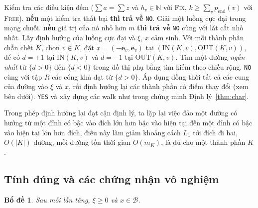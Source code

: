 \documentclass[pdflatex,sn-mathphys-num]{sn-jnl}
\theoremstyle{thmstyleone}
\newtheorem{lemma}[theorem]{Bổ đề}
\theoremstyle{thmstyletwo}
\theoremstyle{thmstylethree}
\newcommand{\N}{\mathbb{N}}
\newcommand{\cB}{\mathcal{B}}
\newcommand{\e}{\mathbf{e}}
\newcommand{\IN}{\mathrm{IN}}
\newcommand{\OUT}{\mathrm{OUT}}
\newcommand{\FIX}{\textup{\textsc{Fix}}}
\newcommand{\FREE}{\textup{\textsc{Free}}}
\newcommand{\YES}{\texttt{YES}}
\newcommand{\NO}{\texttt{NO}}
\begin{document}
\begin{algorithm}[t]
\caption{Thuật toán đường tăng cho \FIX{} và \FREE{}}\label{alg:pf}
\begin{algorithmic}[1]
\State Kiểm tra các điều kiện đếm ($\sum a=\sum z$ và $h_v\in\N$ với \FIX{}, $k\ge\sum_vp_{\mathrm{end}}(v)$ với \FREE{}). \textbf{nếu} một kiểm tra thất bại \textbf{thì trả về} \NO{}.
\State Giải một luồng cực đại trong mạng chuỗi. \textbf{nếu} giá trị của nó nhỏ hơn $m$ \textbf{thì trả về} \NO{} cùng với lát cắt nhỏ nhất.
\State Lấy định hướng của luồng cực đại và $\xi$, $x$ cảm sinh. Với mỗi thành phần chẵn chết $K$, chọn $v\in K$, đặt $x=(-\e_v,\e_v)$ tại $(\IN(K,v),\OUT(K,v))$, để có $d=+1$ tại $\IN(K,v)$ và $d=-1$ tại $\OUT(K,v)$.
  \State Tìm một đường \emph{ngắn nhất} từ $\{d>0\}$ đến $\{d<0\}$ trong đồ thị phụ bằng tìm kiếm theo chiều rộng.
    \State \Return \NO{} cùng với tập $R$ các cổng khả đạt từ $\{d>0\}$.
  \EndIf
  \State Áp dụng đồng thời tất cả các cung của đường vào $\xi$ và $x$, rồi định hướng lại các thành phần có điểm thay đổi (xem bên dưới).
\EndWhile
\State \Return \YES{} và xây dựng các walk như trong chứng minh Định lý~\ref{thm:char}.
\end{algorithmic}
\end{algorithm}

Trong phép định hướng lại đạt cận định lý, ta lặp lại việc đảo một đường có hướng từ một đỉnh có bậc vào đích lớn hơn bậc vào hiện tại đến một đỉnh có bậc vào hiện tại lớn hơn đích, điều này làm giảm khoảng cách $L_1$ tới đích đi hai, $O(|K|)$ đường, mỗi đường tốn thời gian $O(m_K)$, là đủ cho một thành phần $K$.

\subsection{Tính đúng và các chứng nhận vô nghiệm}

\begin{lemma}\label{lem:invariant}
Sau mỗi lần tăng, $\xi\ge0$ và $x\in\cB$.
\end{lemma}
\end{document}

